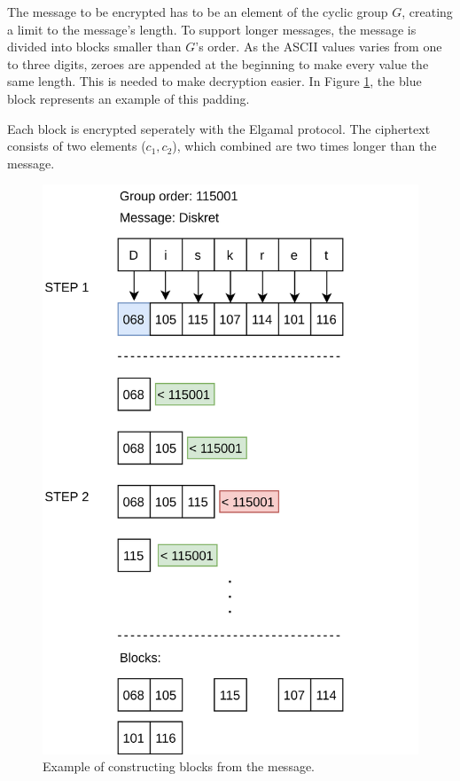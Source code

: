 \documentclass{article}
\begin{document}
The message to be encrypted has to be an element of the cyclic group $G$, creating a limit to the message's length. To support longer messages, the message is divided into blocks smaller than $G$'s order. As the ASCII values varies from one to three digits, zeroes are appended at the beginning to make every value the same length. This is needed to make decryption easier. In Figure \ref{blocks}, the blue block represents an example of this padding. 

Each block is encrypted seperately with the Elgamal protocol. The ciphertext consists of two elements ($c_1, c_2$), which combined are two times longer than the message.  

\begin{figure}
    \centering
    \includegraphics[scale=0.1]{img/construct-blocks.png}
    \caption{Example of constructing blocks from the message.}
    \label{blocks}
\end{figure}
\end{document}
